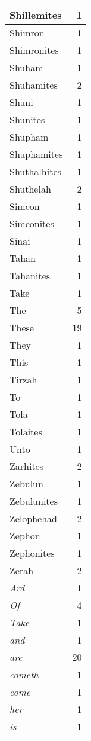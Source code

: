 \begin{center}
\begin{longtable}{l|r}
Shillemites & 1\\ \hline 
Shimron & 1\\ \hline 
Shimronites & 1\\ \hline 
Shuham & 1\\ \hline 
Shuhamites & 2\\ \hline 
Shuni & 1\\ \hline 
Shunites & 1\\ \hline 
Shupham & 1\\ \hline 
Shuphamites & 1\\ \hline 
Shuthalhites & 1\\ \hline 
Shuthelah & 2\\ \hline 
Simeon & 1\\ \hline 
Simeonites & 1\\ \hline 
Sinai & 1\\ \hline 
Tahan & 1\\ \hline 
Tahanites & 1\\ \hline 
Take & 1\\ \hline 
The & 5\\ \hline 
These & 19\\ \hline 
They & 1\\ \hline 
This & 1\\ \hline 
Tirzah & 1\\ \hline 
To & 1\\ \hline 
Tola & 1\\ \hline 
Tolaites & 1\\ \hline 
Unto & 1\\ \hline 
Zarhites & 2\\ \hline 
Zebulun & 1\\ \hline 
Zebulunites & 1\\ \hline 
Zelophehad & 2\\ \hline 
Zephon & 1\\ \hline 
Zephonites & 1\\ \hline 
Zerah & 2\\ \hline 
\emph{Ard} & 1\\ \hline 
\emph{Of} & 4\\ \hline 
\emph{Take} & 1\\ \hline 
\emph{and} & 1\\ \hline 
\emph{are} & 20\\ \hline 
\emph{cometh} & 1\\ \hline 
\emph{come} & 1\\ \hline 
\emph{her} & 1\\ \hline 
\emph{is} & 1\\ \hline 

\end{longtable}
\end{center}
